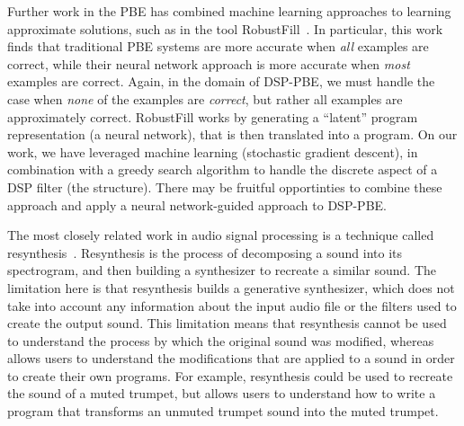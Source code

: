 Further work in the PBE has combined machine learning approaches to learning approximate solutions, such as in the tool RobustFill~\cite{devlin2017robustfill}.
In particular, this work finds that traditional PBE systems are more accurate when \textit{all} examples are correct, while their neural network approach is more accurate when \textit{most} examples are correct.
Again, in the domain of DSP-PBE, we must handle the case when \textit{none} of the examples are \textit{correct}, but rather all examples are approximately correct.
RobustFill works by generating a ``latent'' program representation (a neural network), that is then translated into a program.
On our work, we have leveraged machine learning (stochastic gradient descent), in combination with a greedy search algorithm to handle the discrete aspect of a DSP filter (the structure).
There may be fruitful opportinties to combine these approach and apply a neural network-guided approach to DSP-PBE.

The most closely related work in audio signal processing is a technique called resynthesis~\cite{masri1996improved}.
Resynthesis is the process of decomposing a sound into its spectrogram, and then building a synthesizer to recreate a similar sound.
The limitation here is that resynthesis builds a generative synthesizer, which does not take into account any information about the input audio file or the filters used to create the output sound.
This limitation means that resynthesis cannot be used to understand the process by which the original sound was modified, whereas \ourTool allows users to understand the modifications that are applied to a sound in order to create their own programs.
For example, resynthesis could be used to recreate the sound of a muted trumpet, but \ourTool allows users to understand how to write a program that transforms an unmuted trumpet sound into the muted trumpet.
